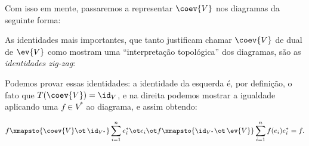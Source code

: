 \documentclass[11pt]{article}
\begin{document}
Com isso em mente, passaremos a representar \(\coev{V}\) nos diagramas da seguinte forma:

\begin{latexfigure}
\end{latexfigure}

As identidades mais importantes, que tanto justificam chamar \(\coev{V}\) de dual de \(\ev{V}\) como mostram uma ``interpretação topológica'' dos diagramas, são as \textit{identidades zig-zag}:


Podemos provar essas identidades: a identidade da esquerda é, por definição, o fato que \(T(\coev{V})=\id_V\), e na direita podemos mostrar a igualdade aplicando uma \(f\in V^*\) ao diagrama, e assim obtendo:

\begin{equation*}
 f\xmapsto{\coev{V}\ot\,\id_{V^*}}
\sum_{i=1}^n e_i^*\ot e_i\ot f
\xmapsto{\id_{V^*}\ot\,\ev{V}} \sum_{i=1}^n f(e_i)e_i^* = f.
\end{equation*}
\end{document}
